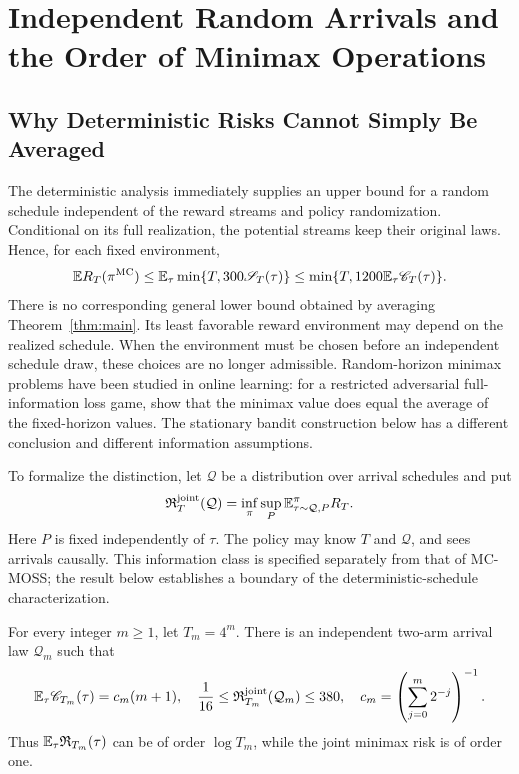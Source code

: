 \section{Independent Random Arrivals and the Order of Minimax Operations}\label{sec:random}
\subsection{Why Deterministic Risks Cannot Simply Be Averaged}
The deterministic analysis immediately supplies an upper bound for a random schedule independent of the reward streams and policy randomization. Conditional on its full realization, the potential streams keep their original laws. Hence, for each fixed environment,
\begin{equation}\label{eq:random-upper}
 \mathbb E R_T(\pi^{\mathrm{MC}})
 \le\mathbb E_\tau\min\{T,300\mathscr S_T(\tau)\}
 \le\min\{T,1200\mathbb E_\tau\mathscr C_T(\tau)\}.
\end{equation}
There is no corresponding general lower bound obtained by averaging Theorem~\ref{thm:main}. Its least favorable reward environment may depend on the realized schedule. When the environment must be chosen before an independent schedule draw, these choices are no longer admissible. Random-horizon minimax problems have been studied in online learning: for a restricted adversarial full-information loss game, \citet{luo2014horizon} show that the minimax value does equal the average of the fixed-horizon values. The stationary bandit construction below has a different conclusion and different information assumptions.

To formalize the distinction, let $\mathcal Q$ be a distribution over arrival schedules and put
\[
 \mathfrak R_T^{\mathrm{joint}}(\mathcal Q)
 =\inf_{\pi}\sup_P\mathbb E_{\tau\sim\mathcal Q,P}^{\pi}R_T.
\]
Here $P$ is fixed independently of $\tau$. The policy may know $T$ and $\mathcal Q$, and sees arrivals causally. This information class is specified separately from that of MC-MOSS; the result below establishes a boundary of the deterministic-schedule characterization.

\begin{theorem}\label{thm:random-main}
For every integer $m\ge1$, let $T_m=4^m$. There is an independent two-arm arrival law $\mathcal Q_m$ such that
\begin{equation}\label{eq:random-main}
 \mathbb E_\tau\mathscr C_{T_m}(\tau)=c_m(m+1),\quad
 \frac1{16}\le\mathfrak R_{T_m}^{\mathrm{joint}}(\mathcal Q_m)\le380,
 \quad c_m=\left(\sum_{j=0}^m2^{-j}\right)^{-1}.
\end{equation}
Thus $\mathbb E_\tau\mathfrak R_{T_m}(\tau)$ can be of order $\log T_m$, while the joint minimax risk is of order one.
\end{theorem}

